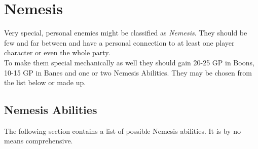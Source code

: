\documentclass[12pt,a4paper,openany,usenames,dvipsnames]{book}
\begin{document}
	\chapter{Nemesis}
	\label{ch:nemesis}
	Very special, personal enemies might be classified as \emph{Nemesis}.
	They should be few and far between and have a personal connection to at least one player character or even the whole party.\\
	To make them special mechanically as well they should gain 20-25 GP in Boons,
		10-15 GP in Banes
		and one or two Nemesis Abilities.
	They may be chosen from the list below or made up.
	\section*{Nemesis Abilities}
	The following section contains a list of possible Nemesis abilities. It is by no means comprehensive.\\
\end{document}
